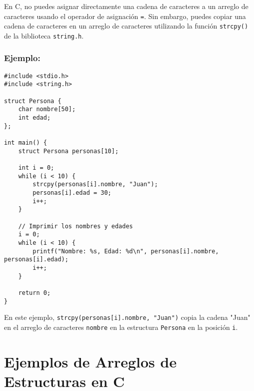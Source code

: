 \documentclass{article}
\begin{document}
En C, no puedes asignar directamente una cadena de caracteres a un arreglo de caracteres usando el operador de asignación \texttt{=}. Sin embargo, puedes copiar una cadena de caracteres en un arreglo de caracteres utilizando la función \texttt{strcpy()} de la biblioteca \texttt{string.h}. 

\subsubsection{Ejemplo:}

\begin{verbatim}
#include <stdio.h>
#include <string.h>

struct Persona {
    char nombre[50];
    int edad;
};

int main() {
    struct Persona personas[10];

    int i = 0;
    while (i < 10) {
        strcpy(personas[i].nombre, "Juan");
        personas[i].edad = 30;
        i++;
    }

    // Imprimir los nombres y edades
    i = 0;
    while (i < 10) {
        printf("Nombre: %s, Edad: %d\n", personas[i].nombre, personas[i].edad);
        i++;
    }

    return 0;
}
\end{verbatim}

En este ejemplo, \texttt{strcpy(personas[i].nombre, "Juan")} copia la cadena "Juan" en el arreglo de caracteres \texttt{nombre} en la estructura \texttt{Persona} en la posición \texttt{i}.

\newpage
\section{Ejemplos de Arreglos de Estructuras en C}
\end{document}
